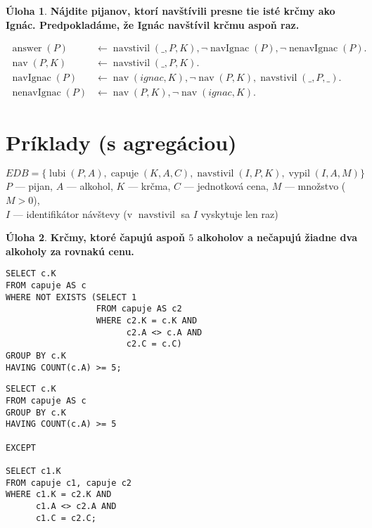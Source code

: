 \documentclass[10pt, a4paper]{article}
\theoremstyle{definition}
\newtheorem{problem}{Úloha}[section]
\DeclareMathOperator{\lubi}{lubi}
\DeclareMathOperator{\capuje}{capuje}
\DeclareMathOperator{\navstivil}{navstivil}
\DeclareMathOperator{\vypil}{vypil}
\DeclareMathOperator{\answer}{answer}
\begin{document}
\begin{problem}
{\bf Nájdite pijanov, ktorí navštívili presne tie isté krčmy ako Ignác. Predpokladáme, že Ignác navštívil krčmu aspoň raz.}

\begin{align*}
\answer(P) & \leftarrow \navstivil( \_,P,K), \lnot \operatorname{navIgnac}(P), \lnot \operatorname{nenavIgnac}(P).\\
\operatorname{nav}(P,K) & \leftarrow \navstivil(\_,P,K).\\
\operatorname{navIgnac}(P) & \leftarrow \operatorname{nav}(ignac,K), \lnot \operatorname{nav}(P,K), \navstivil (\_ ,P,\_).\\
\operatorname{nenavIgnac}(P) & \leftarrow \operatorname{nav}(P,K), \lnot \operatorname{nav}(ignac,K).
\end{align*}

\end{problem}


\section{Príklady (s agregáciou)}
$EDB = \{\lubi(P, A), \capuje(K, A, C), \navstivil(I, P, K), \vypil(I, A, M)\}$\\[2mm]
$P$ --- pijan, $A$ --- alkohol, $K$ --- krčma, $C$ --- jednotková cena, $M$ --- množstvo ($M > 0$),\\
$I$ --- identifikátor návštevy (v $\navstivil$ sa $I$ vyskytuje len raz)



\begin{problem}
{\bf Krčmy, ktoré čapujú aspoň $5$ alkoholov a nečapujú žiadne dva alkoholy za rovnakú cenu.}\\[5mm]
\begin{minipage}{0.49\textwidth}
\begin{verbatim}
SELECT c.K
FROM capuje AS c
WHERE NOT EXISTS (SELECT 1
                  FROM capuje AS c2
                  WHERE c2.K = c.K AND
                        c2.A <> c.A AND
                        c2.C = c.C)
GROUP BY c.K
HAVING COUNT(c.A) >= 5;
\end{verbatim}
\end{minipage}
\begin{minipage}{0.49\textwidth}
\begin{verbatim}
SELECT c.K
FROM capuje AS c
GROUP BY c.K
HAVING COUNT(c.A) >= 5

EXCEPT

SELECT c1.K
FROM capuje c1, capuje c2
WHERE c1.K = c2.K AND
      c1.A <> c2.A AND
      c1.C = c2.C;
\end{verbatim}
\end{minipage}
\end{problem}
\end{document}
